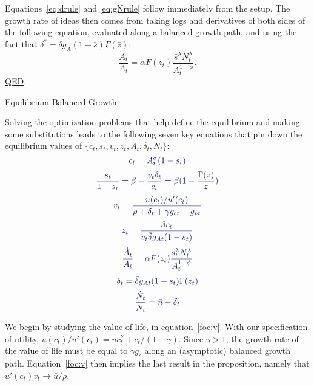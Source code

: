 \documentclass[12pt,twoside]{article}
\newcommand{\growth}[1]{\frac{\dot{#1}_t}{{#1}_t}}
\newcommand{\clr}[1]{{\color{ChadBlue} #1}}
\newcommand{\Proof}[2]{\newline {\hspace{-\parindent} {\color{ChadGreen}\bf Proof of Proposition}~\ref{#1}.}
{\color{ChadBlue} #2} \vspace{.1in}}
\begin{document}
Equations~\eqref{eq:drule} and \eqref{eq:gNrule} follow immediately from
the setup. The growth rate of ideas then comes from taking logs and
derivatives of both sides of the following equation, evaluated along a
balanced growth path, and using the fact that $\delta^* = \bar{\delta}
g_A (1-\bar{s}) \Gamma(\bar{z})$:
\[
\growth{A} = \alpha F(z_t) \frac{\bar{s}^\lambda N_t^{\lambda}}{A_t ^{1-\phi}}.
\]
\hyperlink{prop:rule}{QED}.

\hypertarget{proof:CE}{}
\Proof{prop:CE}{Equilibrium Balanced Growth}

Solving the optimization problems that help define the equilibrium and
making some substitutions leads to the following seven key equations
that pin down the equilibrium values of
$\{c_t,s_t,v_t,z_t,A_t,\delta_t,N_t\}$:
\begin{equation}
\label{foc:c}
\clr{ c_t = A_t ^\sigma (1-s_t)  }
\end{equation}
\begin{equation}
\label{foc:s}
\clr{ \frac{s_t}{1-s_t} = \beta - \frac{v_t \delta_t}{c_t} = \beta (1-\frac{\Gamma(z)}{z})  }
\end{equation}
\begin{equation}
\label{foc:v}
\clr{ v_t = \frac{u(c_t)/u'(c_t)}{\rho+\delta_t+\gamma g_{ct} - g_{vt}}  }
\end{equation}
\begin{equation}
\label{foc:z}
\clr{ z_t = \frac{\beta c_t}{v_t \bar\delta g_{At} (1-s_t)}  }
\end{equation}
\begin{equation}
\label{foc:A}
\clr{ \growth{A} = \alpha F(z_t) \frac{s_t ^\lambda N_t ^\lambda}{A_t ^{1-\phi}}  }
\end{equation}
\begin{equation}
\label{foc:dlta}
\clr{ \delta_t = \bar\delta g_{At} (1-s_t) \Gamma(z_t)  }
\end{equation}
\begin{equation}
\label{foc:N}
\clr{ \growth{N} = \bar{n} - \delta_t  }
\end{equation}

We begin by studying the value of life, in equation~\eqref{foc:v}. With
our specification of utility, $u(c_t)/u'(c_t)=\bar{u} c_t ^\gamma +
c_t/(1-\gamma)$. Since $\gamma>1$, the growth rate of the value of life
must be equal to $\gamma g_c$ along an (asymptotic) balanced growth
path.  Equation~\eqref{foc:v} then implies the last result in the
proposition, namely that $u'(c_t) v_t \rightarrow \bar{u}/\rho$.
\end{document}
